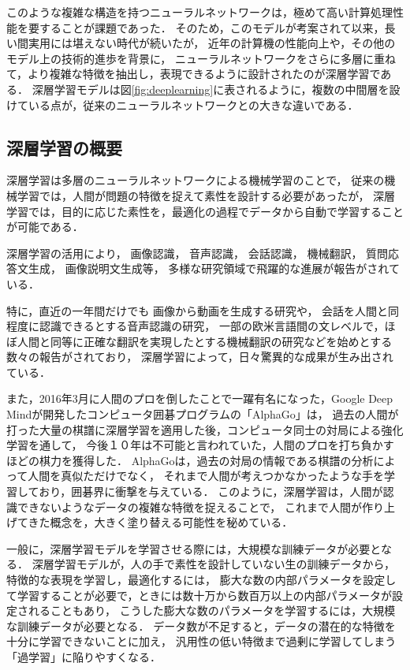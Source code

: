 このような複雑な構造を持つニューラルネットワークは，極めて高い計算処理性能を要することが課題であった．
そのため，このモデルが考案されて以来，長い間実用には堪えない時代が続いたが，
近年の計算機の性能向上や，その他のモデル上の技術的進歩を背景に，
ニューラルネットワークをさらに多層に重ねて，より複雑な特徴を抽出し，表現できるように設計されたのが深層学習である．
深層学習モデルは図\ref{fig:deeplearning}に表されるように，複数の中間層を設けている点が，従来のニューラルネットワークとの大きな違いである．




\subsection{深層学習の概要}
深層学習は多層のニューラルネットワークによる機械学習のことで，
従来の機械学習では，人間が問題の特徴を捉えて素性を設計する必要があったが，
深層学習では，目的に応じた素性を，最適化の過程でデータから自動で学習することが可能である．

深層学習の活用により，
画像認識\cite{schroff2015facenet,szegedy2014going}，
音声認識\cite{hinton2012deep, bahdanau2015end}，
会話認識\cite{sak2015fast}，
機械翻訳\cite{sutskever2014sequence, dong2015multi}，
質問応答文生成\cite{yin2015neural}，
画像説明文生成\cite{xu2015show,vinyals2014show}等，
多様な研究領域で飛躍的な進展が報告がされている．

特に，直近の一年間だけでも
画像から動画を生成する研究\cite{vondrick2016generating}や，
会話を人間と同程度に認識できるとする音声認識の研究\cite{xiong2016achieving}，
一部の欧米言語間の文レベルで，ほぼ人間と同等に正確な翻訳を実現したとする機械翻訳の研究\cite{wu2016google}などを始めとする数々の報告がされており，
深層学習によって，日々驚異的な成果が生み出されている．

また，2016年3月に人間のプロを倒したことで一躍有名になった，Google Deep Mindが開発したコンピュータ囲碁プログラムの「AlphaGo」\cite{silver2016mastering}は，
過去の人間が打った大量の棋譜に深層学習を適用した後，コンピュータ同士の対局による強化学習を通して，
今後１０年は不可能と言われていた，人間のプロを打ち負かすほどの棋力を獲得した．
AlphaGoは，過去の対局の情報である棋譜の分析によって人間を真似ただけでなく，
それまで人間が考えつかなかったような手を学習しており，囲碁界に衝撃を与えている．
このように，深層学習は，人間が認識できないようなデータの複雑な特徴を捉えることで，
これまで人間が作り上げてきた概念を，大きく塗り替える可能性を秘めている．


一般に，深層学習モデルを学習させる際には，大規模な訓練データが必要となる．
深層学習モデルが，人の手で素性を設計していない生の訓練データから，特徴的な表現を学習し，最適化するには，
膨大な数の内部パラメータを設定して学習することが必要で，ときには数十万から数百万以上の内部パラメータが設定されることもあり，
こうした膨大な数のパラメータを学習するには，大規模な訓練データが必要となる．
データ数が不足すると，データの潜在的な特徴を十分に学習できないことに加え，
汎用性の低い特徴まで過剰に学習してしまう「過学習」に陥りやすくなる\cite{tetko1995neural}．

